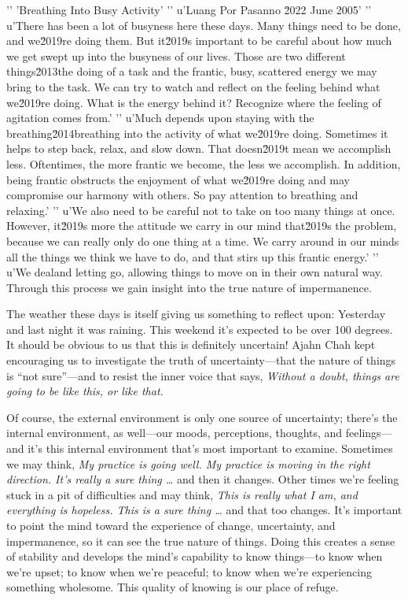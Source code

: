 '\n'
'Breathing Into Busy Activity'
'\n'
u'Luang Por Pasanno \u2022 June 2005'
'\n'
u'There has been a lot of busyness here these days. Many things need to be done, and we\u2019re doing them. But it\u2019s important to be careful about how much we get swept up into the busyness of our lives. Those are two different things\u2013the doing of a task and the frantic, busy, scattered energy we may bring to the task. We can try to watch and reflect on the feeling behind what we\u2019re doing. What is the energy behind it? Recognize where the feeling of agitation comes from.'
'\n'
u'Much depends upon staying with the breathing\u2014breathing into the activity of what we\u2019re doing. Sometimes it helps to step back, relax, and slow down. That doesn\u2019t mean we accomplish less. Oftentimes, the more frantic we become, the less we accomplish. In addition, being frantic obstructs the enjoyment of what we\u2019re doing and may compromise our harmony with others. So pay attention to breathing and relaxing.'
'\n'
u'We also need to be careful not to take on too many things at once. However, it\u2019s more the attitude we carry in our mind that\u2019s the problem, because we can really only do one thing at a time. We carry around in our minds all the things we think we have to do, and that stirs up this frantic energy.'
'\n'
u'We dealand 
letting go, allowing things to move on in their own natural way. 
Through this process we gain insight into the true nature of 
impermanence.


The weather these days is itself giving us something to reflect upon: 
Yesterday and last night it was raining. This weekend it's expected to 
be over 100 degrees. It should be obvious to us that this is definitely 
uncertain! Ajahn Chah kept encouraging us to investigate the truth of 
uncertainty---that the nature of things is ``not sure''---and to resist 
the inner voice that says, \emph{Without a doubt, things are going to 
be like this, or like that.}

Of course, the external environment is only one source of uncertainty; 
there's the internal environment, as well---our moods, perceptions, 
thoughts, and feelings---and it's this internal environment that's most 
important to examine. Sometimes we may think, \emph{My practice is 
going well. My practice is moving in the right direction. It's really a 
sure thing \ldots{}} and then it changes. Other times we're feeling 
stuck in a pit of difficulties and may think, \emph{This is really what 
I am, and everything is hopeless. This is a sure thing \ldots{}} and 
that too changes. It's important to point the mind toward the 
experience of change, uncertainty, and impermanence, so it can see the 
true nature of things. Doing this creates a sense of stability and 
develops the mind's capability to know things---to know when we're 
upset; to know when we're peaceful; to know when we're experiencing 
something wholesome. This quality of knowing is our place of refuge.


